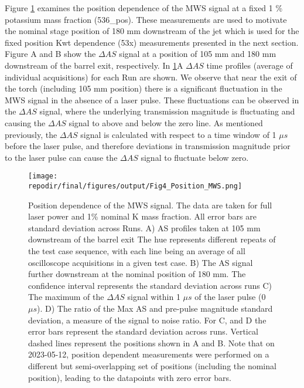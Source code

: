 Figure \ref{fig:pos_dependence_mws} examines the position dependence of the MWS signal at a fixed 1 \% potassium mass fraction (536\_pos).  These measurements are used to motivate the nominal stage position of 180 mm downstream of the jet which is used for the fixed position Kwt dependence (53x) measurements presented in the next section. Figure A and B show the $\Delta AS$ signal at a position of 105 mm and 180 mm downstream of the barrel exit, respectively. In \ref{fig:pos_dependence_mws}A $\Delta AS$ time profiles (average of individual acquisitions) for each Run are shown. We observe that near the exit of the torch (including 105 mm position) there is a significant fluctuation in the MWS signal in the absence of a laser pulse. These fluctuations can be observed in the $\Delta AS$ signal, where the underlying transmission magnitude is fluctuating and causing the $\Delta AS$ signal to above and below the zero line. As mentioned previously, the $\Delta AS$ signal is calculated with respect to a time window of 1 $\mu s$ before the laser pulse, and therefore deviations in transmission magnitude prior to the laser pulse can cause the $\Delta AS$ signal to fluctuate below zero.


\begin{figure}[h]
    \texttt{[image: \\repodir/final/figures/output/Fig4\_Position\_MWS.png]} 
    \centering
    \caption{Position dependence of the MWS signal. The data are taken for full laser power and 1\% nominal K mass fraction. All error bars are standard deviation across Runs.  A) AS profiles taken at 105 mm downstream of the barrel exit The hue represents different repeats of the test case sequence, with each line being an average of all oscilloscope acquisitions in a given test case.  B) The AS signal further downstream at the nominal position of 180 mm. The confidence interval represents the standard deviation across runs C)  The maximum of the $\Delta AS$ signal within 1 $\mu s$ of the laser pulse (0 $\mu s$).  D) The ratio of the Max AS and pre-pulse magnitude standard deviation, a measure of the signal to noise ratio. For C, and D the error bars represent the standard deviation across runs. Vertical dashed lines represent the positions shown in A and B. Note that on 2023-05-12, position dependent measurements were performed on a different but semi-overlapping set of positions (including the nominal position), leading to the datapoints with zero error bars. } 
    \label{fig:pos_dependence_mws}
\end{figure}

